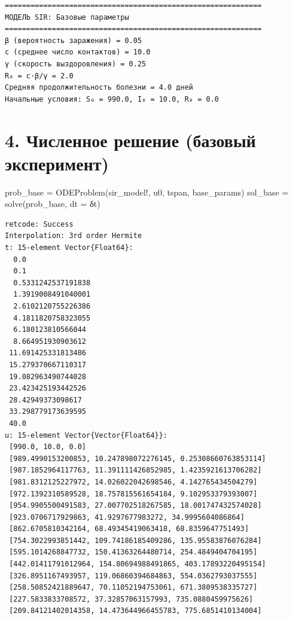 \documentclass[
  12pt,
  a4paper,
  DIV=11,
  numbers=noendperiod]{scrreprt}
\newenvironment{Shaded}{\begin{snugshade}}{\end{snugshade}}
\newcommand{\FunctionTok}[1]{\textcolor[rgb]{0.28,0.35,0.67}{#1}}
\newcommand{\NormalTok}[1]{\textcolor[rgb]{0.00,0.23,0.31}{#1}}
\newcommand{\OperatorTok}[1]{\textcolor[rgb]{0.37,0.37,0.37}{#1}}
\begin{document}
\begin{verbatim}
============================================================
МОДЕЛЬ SIR: Базовые параметры
============================================================
β (вероятность заражения) = 0.05
c (среднее число контактов) = 10.0
γ (скорость выздоровления) = 0.25
R₀ = c·β/γ = 2.0
Средняя продолжительность болезни = 4.0 дней
Начальные условия: S₀ = 990.0, I₀ = 10.0, R₀ = 0.0
\end{verbatim}

\section{4. Численное решение (базовый
эксперимент)}\label{ux447ux438ux441ux43bux435ux43dux43dux43eux435-ux440ux435ux448ux435ux43dux438ux435-ux431ux430ux437ux43eux432ux44bux439-ux44dux43aux441ux43fux435ux440ux438ux43cux435ux43dux442}

\begin{Shaded}
\begin{Highlighting}[]
\NormalTok{prob\_base }\OperatorTok{=} \FunctionTok{ODEProblem}\NormalTok{(sir\_model!, u0, tspan, base\_params)}
\NormalTok{sol\_base }\OperatorTok{=} \FunctionTok{solve}\NormalTok{(prob\_base, dt }\OperatorTok{=}\NormalTok{ δt)}
\end{Highlighting}
\end{Shaded}

\begin{verbatim}
retcode: Success
Interpolation: 3rd order Hermite
t: 15-element Vector{Float64}:
  0.0
  0.1
  0.5331242537191838
  1.3919008491040001
  2.6102120755226386
  4.1811820758323055
  6.180123810566044
  8.664951930903612
 11.691425331813486
 15.279370667110317
 19.082963490744028
 23.423425193442526
 28.42949373098617
 33.298779173639595
 40.0
u: 15-element Vector{Vector{Float64}}:
 [990.0, 10.0, 0.0]
 [989.4990153200853, 10.247898072276145, 0.25308660763853114]
 [987.1852964117763, 11.391111426852985, 1.4235921613706282]
 [981.8312125227972, 14.026022042698546, 4.142765434504279]
 [972.1392310589528, 18.757815561654184, 9.102953379393007]
 [954.9905500491583, 27.007702518267585, 18.001747432574028]
 [923.0706717929863, 41.9297677983272, 34.9995604086864]
 [862.6705810342164, 68.49345419063418, 68.8359647751493]
 [754.3022993851442, 109.74186185409286, 135.95583876076284]
 [595.1014268847732, 150.41363264480714, 254.4849404704195]
 [442.01411791012964, 154.80694988491865, 403.17893220495154]
 [326.8951167493957, 119.06860394684863, 554.0362793037555]
 [258.50852421889647, 70.11052194753061, 671.3809538335727]
 [227.5833833708572, 37.32857063157993, 735.0880459975626]
 [209.84121402014358, 14.473644966455783, 775.6851410134004]
\end{verbatim}
\end{document}
